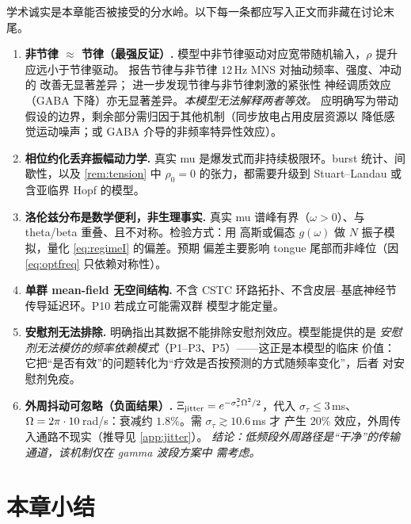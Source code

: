 学术诚实是本章能否被接受的分水岭。以下每一条都应写入正文而非藏在讨论末尾。

\begin{enumerate}[leftmargin=2.2em,itemsep=4pt]

\item \textbf{非节律 $\approx$ 节律（最强反证）.}
模型中非节律驱动对应宽带随机输入，$\rho$ 提升应远小于节律驱动。
\citet{Iverson2023a} 报告节律与非节律 $12\,$Hz MNS 对抽动频率、强度、冲动的
改善无显著差异；\citet{Houlgreave2025} 进一步发现节律与非节律刺激的紧张性
神经调质效应（GABA 下降）亦无显著差异。\emph{本模型无法解释两者等效。}
应明确写为带动假设的边界，剩余部分需归因于其他机制（同步放电占用皮层资源以
降低感觉运动噪声；或 GABA 介导的非频率特异性效应）。

\item \textbf{相位约化丢弃振幅动力学.}
真实 mu 是爆发式而非持续极限环。burst 统计、间歇性，以及 \cref{rem:tension}
中 $\rho_0=0$ 的张力，都需要升级到 Stuart--Landau 或含亚临界 Hopf 的模型。

\item \textbf{洛伦兹分布是数学便利，非生理事实.}
真实 mu 谱峰有界（$\omega>0$）、与 theta/beta 重叠、且不对称。检验方式：用
高斯或偏态 $g(\omega)$ 做 $N$ 振子模拟，量化 \cref{eq:regimeI} 的偏差。预期
偏差主要影响 tongue 尾部而非峰位（因 \cref{eq:optfreq} 只依赖对称性）。

\item \textbf{单群 mean-field 无空间结构.}
不含 CSTC 环路拓扑、不含皮层--基底神经节传导延迟环。P10 若成立可能需双群
模型才能定量。

\item \textbf{安慰剂无法排除.}
\citet{Iverson2023a} 明确指出其数据不能排除安慰剂效应。模型能提供的是
\emph{安慰剂无法模仿的频率依赖模式}（P1--P3、P5）——这正是本模型的临床
价值：它把“是否有效”的问题转化为“疗效是否按预测的方式随频率变化”，后者
对安慰剂免疫。

\item \textbf{外周抖动可忽略（负面结果）.}
$\Xi_{\mathrm{jitter}}=e^{-\sigma_\tau^2\Omega^2/2}$，代入 $\sigma_\tau\le3\,$ms、
$\Omega=2\pi\cdot10\,$rad/s：衰减约 $1.8\%$。需 $\sigma_\tau\gtrsim10.6\,$ms 才
产生 $20\%$ 效应，外周传入通路不现实（推导见 \cref{app:jitter}）。
\emph{结论：低频段外周路径是“干净”的传输通道，该机制仅在 gamma 波段方案中
需考虑。}

\end{enumerate}

\section*{本章小结}
\label{sec:summary}

